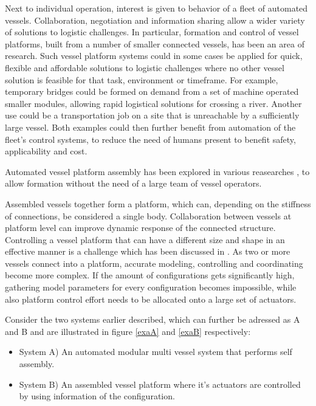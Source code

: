 Next to individual operation, interest is given to behavior of a fleet of automated vessels. Collaboration, negotiation and information sharing allow a wider variety of solutions to logistic challenges. In particular, formation and control of vessel platforms, built from a number of smaller connected vessels, has been an area of research. Such vessel platform systems could in some cases be applied  for quick, flexible and affordable solutions to logistic challenges where no other vessel solution is feasible for that task, environment or timeframe. For example, temporary bridges could be formed on demand from a set of machine operated smaller modules, allowing rapid logistical solutions for crossing a river. Another use could be a transportation job on a site that is unreachable by a sufficiently large vessel. Both examples could then further benefit from automation of the fleet's control systems, to reduce the need of humans present to benefit safety, applicability and cost.




Automated vessel platform assembly has been explored in various reasearches
\cite{mateos2019autonomous} %
\cite{o2014self} %
\cite{paulos2015automated} %
, to allow formation without the need of a large team of vessel operators. 

Assembled vessels together form a platform, which can, depending on the stiffness of connections, be considered a single body. Collaboration between vessels at platform level can improve dynamic response of the connected structure. Controlling a vessel platform that can have a different size and shape in an effective manner is a challenge which has been discussed in \cite{park2019coordinated} \cite{kayacan2019learning}. As two or more vessels connect into a platform, accurate modeling, controlling and coordinating become more complex. If the amount of configurations gets significantly high, gathering model parameters for every configuration becomes impossible, while also platform control effort needs to be allocated onto a large set of actuators. 

Consider the two systems earlier described, which can further be adressed as A and B and are illustrated in figure \ref{exaA} and \ref{exaB} respectively:
\begin{itemize}
	\item System A) An automated modular multi vessel system that performs self assembly.
	\item System B) An assembled vessel platform where it's actuators are controlled by using information of the configuration.
\end{itemize}

